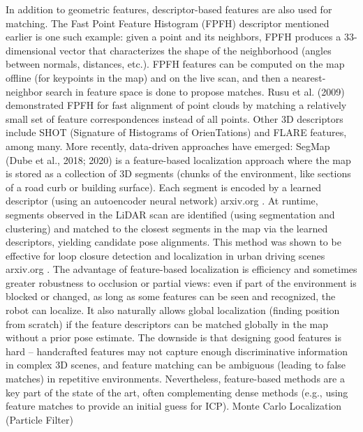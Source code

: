 In addition to geometric features, descriptor-based features are also used for matching. The Fast Point Feature Histogram (FPFH) descriptor mentioned earlier is one such example: given a point and its neighbors, FPFH produces a 33-dimensional vector that characterizes the shape of the neighborhood (angles between normals, distances, etc.). FPFH features can be computed on the map offline (for keypoints in the map) and on the live scan, and then a nearest-neighbor search in feature space is done to propose matches. Rusu et al. (2009) demonstrated FPFH for fast alignment of point clouds by matching a relatively small set of feature correspondences instead of all points. Other 3D descriptors include SHOT (Signature of Histograms of OrienTations) and FLARE features, among many. More recently, data-driven approaches have emerged: SegMap (Dube et al., 2018; 2020) is a feature-based localization approach where the map is stored as a collection of 3D segments (chunks of the environment, like sections of a road curb or building surface). Each segment is encoded by a learned descriptor (using an autoencoder neural network)​
arxiv.org
. At runtime, segments observed in the LiDAR scan are identified (using segmentation and clustering) and matched to the closest segments in the map via the learned descriptors, yielding candidate pose alignments. This method was shown to be effective for loop closure detection and localization in urban driving scenes​
arxiv.org
. The advantage of feature-based localization is efficiency and sometimes greater robustness to occlusion or partial views: even if part of the environment is blocked or changed, as long as some features can be seen and recognized, the robot can localize. It also naturally allows global localization (finding position from scratch) if the feature descriptors can be matched globally in the map without a prior pose estimate. The downside is that designing good features is hard – handcrafted features may not capture enough discriminative information in complex 3D scenes, and feature matching can be ambiguous (leading to false matches) in repetitive environments. Nevertheless, feature-based methods are a key part of the state of the art, often complementing dense methods (e.g., using feature matches to provide an initial guess for ICP).
Monte Carlo Localization (Particle Filter)

